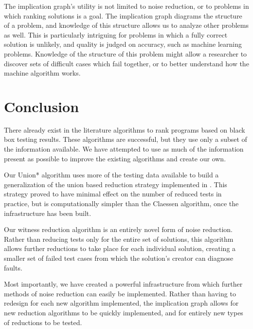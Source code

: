 \documentclass[11pt]{article}
\begin{document}
The implication graph's utility is not limited to noise reduction, or to problems in which ranking solutions is a goal. The implication graph diagrams the structure of a problem, and knowledge of this structure allows us to analyze other problems as well. This is particularly intriguing for problems in which a fully correct solution is unlikely, and quality is judged on accuracy, such as machine learning problems. Knowledge of the structure of this problem might allow a researcher to discover sets of difficult cases which fail together, or to better understand how the machine algorithm works.


\section{Conclusion}
There already exist in the literature algorithms to rank programs based on black box testing results. These algorithms are successful, but they use only a subset of the information available. We have attempted to use as much of the information present as possible to improve the existing algorithms and create our own.

Our Union* algorithm uses more of the testing data available to build a generalization of the union based reduction strategy implemented in \cite{Claessen}. This strategy proved to have minimal effect on the number of reduced tests in practice, but is computationally simpler than the Claessen algorithm, once the infrastructure has been built.

Our witness reduction algorithm is an entirely novel form of noise reduction. Rather than reducing tests only for the entire set of solutions, this algorithm allows further reductions to take place for each individual solution, creating a smaller set of failed test cases from which the solution's creator can diagnose faults.

Most importantly, we have created a powerful infrastructure from which further methods of noise reduction can easily be implemented. Rather than having to redesign for each new algorithm implemented, the implication graph allows for new reduction algorithms to be quickly implemented, and for entirely new types of reductions to be tested.



\end{document}
